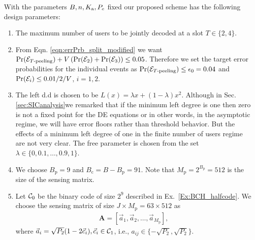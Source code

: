  With the parameters $B,n,K_{\text{a}},P_e$ fixed our proposed scheme has the following design parameters:
\begin{enumerate}
\item The maximum number of users to be jointly decoded at a slot $T\in\{2,4\}$.
\item From Eqn. \ref{eqn:errPrb_split_modified} we want $\mathrm{Pr}(\mathcal{E}_{T\text{-peeling}})+V\left(\mathrm{Pr}(\mathcal{E}_2)+\mathrm{Pr}(\mathcal{E}_3)\right)\leq 0.05$. Therefore we set the target error probabilities for the individual events as $\mathrm{Pr}(\mathcal{E}_{T\text{-peeling}})\leq \epsilon_0=0.04$ and $\mathrm{Pr}(\mathcal{E}_i)\leq 0.01/2/V$, $i=1,2$.
\item  The left d.d is chosen to be $L(x)=\lambda x+(1-\lambda)x^2$. Although in Sec. \ref{sec:SICanalysis}we remarked that if the minimum left degree is one then zero is not a fixed point for the DE equations or in other words, in the asymptotic regime, we will have error floors rather than threshold behavior. But the effects of a minimum left degree of one in the finite number of users regime are not very clear. The free parameter is chosen from the set $\lambda\in\{0,0.1,\ldots,0.9,1\}$.
\item We choose $B_\mathrm{p}=9$ and $B_\mathrm{c}=B-B_\mathrm{p}=91$. Note that $M_\mathrm{p}=2^{B_\mathrm{p}}=512$ is the size of the sensing matrix.
\item Let $\mathcal{C}_0$ be the binary code of size $2^9$ described in Ex.~\ref{Ex:BCH_halfcode}.
We choose the sensing matrix of size $J\times M_\mathrm{p}=63\times 512$ as
\begin{align}
\mathbf{A}=[\vec{a}_1,\vec{a}_2,\ldots,\vec{a}_{M_\mathrm{p}}],
\label{eqn:sensingMatrix_defn}
\end{align}
where $\vec{a}_i=\sqrt{P_2}(1-2\vec{c}_i), \vec{c}_i\in\mathcal{C}_1$, i.e., $a_{ij}\in\{-\sqrt{P_2},\sqrt{P_2}\}$.
\end{enumerate}

